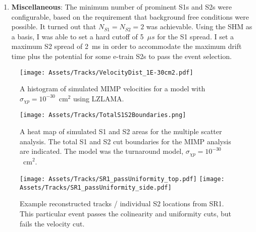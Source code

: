 \begin{enumerate}
    \item \textbf{Miscellaneous}: The minimum number of prominent S1s and S2s were configurable, based on the requirement that background free conditions were possible. It turned out that $N_{S1}=N_{S2}=2$ was achievable.
    Using the SHM as a basis, I was able to set a hard cutoff of 5~$\mu s$ for the S1 spread.
    I  set a maximum S2 spread of 2~ms in order to accommodate the maximum drift time plus the potential for some e-train S2s to pass the event selection.
\end{enumerate}

\begin{figure}
    \centering
    \texttt{[image: Assets/Tracks/VelocityDist\_1E-30cm2.pdf]}
    \caption{A histogram of simulated MIMP velocities for a model with $\sigma_{\chi p} =10^{-30}$~cm$^2$ using LZLAMA.}
    \label{fig:mimp_vdist}
\end{figure}

\begin{figure}
    \centering
    \texttt{[image: Assets/Tracks/TotalS1S2Boundaries.png]}
    \caption[A heat map of simulated S1 and S2 areas for the multiple scatter analysis.]%
    {A heat map of simulated S1 and S2 areas for the multiple scatter analysis.
    The total S1 and S2 cut boundaries for the MIMP analysis are indicated.
    The model was the turnaround model, $\sigma_{\chi p} =10^{-30}$~cm$^2$.}
    \label{fig:total_s1_s2}
\end{figure}

\begin{figure}
    \centering
    \texttt{[image: Assets/Tracks/SR1\_passUniformity\_top.pdf]}
        \texttt{[image: Assets/Tracks/SR1\_passUniformity\_side.pdf]}
    \caption[Example reconstructed tracks / individual S2 locations from SR1.]%
    {Example reconstructed tracks / individual S2 locations from SR1.
    This particular event passes the colinearity and uniformity cuts, but fails the velocity cut.}
    \label{fig:sr1_tracks}
\end{figure}
